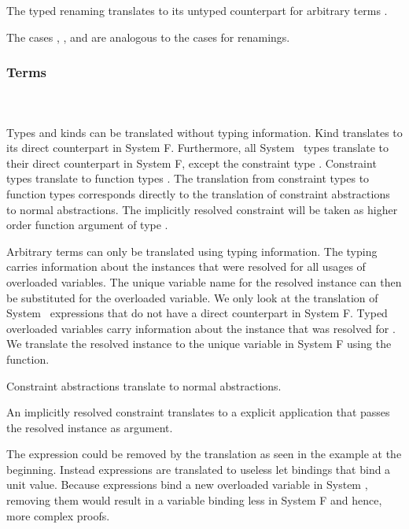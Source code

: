 \noindent The typed renaming  translates to its untyped counterpart for arbitrary terms .

\noindent The cases , ,  and  are analogous to the cases for renamings. 

\subsubsection{Terms}\hfill\\\\
Types and kinds can be translated without typing information. Kind  translates to its direct counterpart in System F. 
Furthermore, all System \Fo\ types translate to their direct counterpart in System F, except the constraint type \Constr{[}  \Constr{:}  \Constr{]⇒} .
\DPTType
Constraint types \Constr{[}  \Constr{:}  \Constr{]⇒}  translate to function types   . 
The translation from constraint types to function types corresponds directly to the translation of constraint abstractions to normal abstractions. 
The implicitly resolved constraint will be taken as higher order function argument of type .

\noindent Arbitrary terms can only be translated using typing information. 
The typing carries information about the instances that were resolved for all usages of overloaded variables. 
The unique variable name for the resolved instance can then be substituted for the overloaded variable. 
We only look at the translation of System \Fo\ expressions that do not have a direct counterpart in System F.
\DPTTerms
Typed overloaded variables  carry information about the instance that was resolved for .
We translate the resolved instance to the unique variable in System F using the  function.

\noindent Constraint abstractions translate to normal abstractions. 

\noindent An implicitly resolved constraint translates to a explicit application that passes the resolved instance as argument. 

\noindent The  expression could be removed by the translation as seen in the example at the beginning. 
Instead  expressions are translated to useless let bindings that bind a unit value.
Because  expressions bind a new overloaded variable in System \Fo, removing them would result in a variable binding less in System F and hence, more complex proofs.

